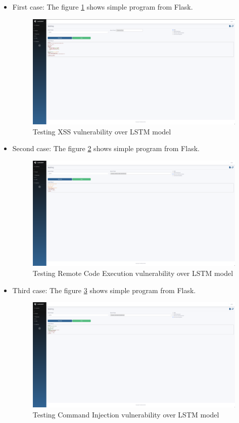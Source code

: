\begin{itemize}
    \item First case: The figure \ref{img:xss1} shows simple program from Flask.
    \begin{figure}[H]
        \centering
        \includegraphics[width=0.6\linewidth]{images/xss1.png}
        \caption{Testing XSS vulnerability over LSTM model}
        \label{img:xss1}
    \end{figure}

    \item Second case: The figure \ref{img:rce1} shows simple program from Flask.
    \begin{figure}[H]
        \centering
        \includegraphics[width=0.6\linewidth]{images/rce1.png}
        \caption{Testing Remote Code Execution vulnerability over LSTM model}
        \label{img:rce1}
    \end{figure}

    \item Third case: The figure \ref{img:ci1} shows simple program from Flask.
    \begin{figure}[H]
        \centering
        \includegraphics[width=0.6\linewidth]{images/ci1.png}
        \caption{Testing Command Injection vulnerability over LSTM model}
        \label{img:ci1}
    \end{figure}


\end{itemize}
